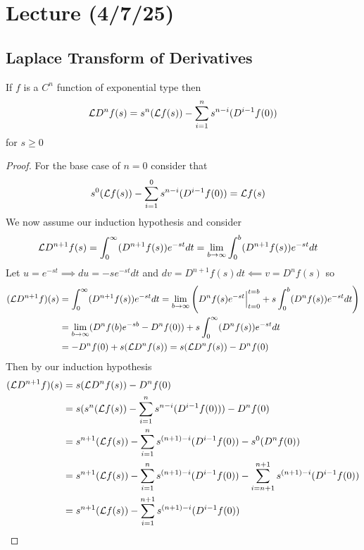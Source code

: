 \documentclass[notes]{subfiles}
\begin{document}
\setcounter{section}{17}
\section{Lecture (4/7/25)}

\subsection{Laplace Transform of Derivatives}
\begin{theorem}
    If $f$ is a $C^n$ function of exponential type then
    \[
        \mathcal{L} D^n f(s) = s^n(\mathcal{L} f(s)) - \sum_{i = 1}^n s^{n - i}(D^{i - 1}f(0))
    \]
    for $s \geq 0$
\end{theorem}
\begin{proof}
    For the base case of $n = 0$ consider that
    \begin{align*}
        s^0(\mathcal{L} f(s)) - \sum_{i = 1}^0 s^{n - i}(D^{i - 1}f(0))
        &= \mathcal{L} f(s)
    \end{align*}
    We now assume our induction hypothesis and consider
    \begin{align*}
        \mathcal{L} D^{n + 1} f(s)
        &= \int_0^\infty (D^{n + 1}f(s))e^{-st}dt
        = \lim_{b\to\infty} \int_0^b (D^{n + 1}f(s))e^{-st}dt
    \end{align*}
    Let $u = e^{-st} \implies du = -se^{-st}dt$ and $dv = D^{n + 1}f(s)dt \impliedby v = D^n f(s)$ so
    \begin{align*}
        (\mathcal{L} D^{n + 1} f)(s)
        &= \int_0^\infty (D^{n + 1}f(s))e^{-st}dt
        = \lim_{b\to\infty} \left( D^n f(s)e^{-st}\Big|_{t = 0}^{t = b} + s\int_0^b (D^n f(s))e^{-st}dt \right) \\
        &= \lim_{b\to\infty} (D^n f(b)e^{-sb} - D^n f(0)) + s\int_0^\infty (D^n f(s))e^{-st}dt \\
        &= -D^n f(0) + s(\mathcal{L} D^n f(s))
        = s(\mathcal{L} D^n f(s)) - D^n f(0)
    \end{align*}
    Then by our induction hypothesis
    \begin{align*}
        (\mathcal{L} D^{n + 1} f)(s)
        &= s(\mathcal{L} D^n f(s)) - D^n f(0) \\
        &= s(s^n(\mathcal{L} f(s)) - \sum_{i = 1}^n s^{n - i}(D^{i - 1}f(0))) - D^n f(0) \\
        &= s^{n + 1}(\mathcal{L} f(s)) - \sum_{i = 1}^n s^{(n + 1) - i}(D^{i - 1}f(0)) - s^0 (D^n f(0)) \\
        &= s^{n + 1}(\mathcal{L} f(s)) - \sum_{i = 1}^n s^{(n + 1) - i}(D^{i - 1}f(0)) - \sum_{i = n + 1}^{n + 1} s^{(n + 1) - i}(D^{i - 1}f(0)) \\
        &= s^{n + 1}(\mathcal{L} f(s)) - \sum_{i = 1}^{n + 1} s^{(n + 1) - i}(D^{i - 1}f(0))
    \end{align*}
\end{proof}
\end{document}
